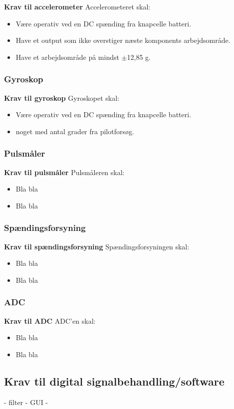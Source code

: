 \textbf{Krav til accelerometer} \newline 
Accelerometeret skal:
\begin{itemize}
\item Være operativ ved en DC spænding fra knapcelle batteri.
\item Have et output som ikke overstiger næste komponents arbejdsområde.
\item Have et arbejdsområde på mindst $\pm$12,85 g.
\end{itemize}


\subsubsection{Gyroskop} 


\textbf{Krav til gyroskop} \newline
Gyroskopet skal:
\begin{itemize}
\item Være operativ ved en DC spænding fra knapcelle batteri.
\item noget med antal grader fra pilotforsøg.
\end{itemize}


\subsubsection{Pulsmåler}

\textbf{Krav til pulsmåler} \newline
Pulsmåleren skal:
\begin{itemize}
\item Bla bla
\item Bla bla
\end{itemize}

\subsubsection{Spændingsforsyning}

\textbf{Krav til spændingsforsyning} \newline
Spændingsforsyningen skal:
\begin{itemize}
\item Bla bla
\item Bla bla
\end{itemize}



\subsubsection{ADC}


\textbf{Krav til ADC} \newline
ADC'en skal:
\begin{itemize}
\item Bla bla
\item Bla bla
\end{itemize}








\subsection{Krav til digital signalbehandling/software}
- filter
- GUI
 -
 


